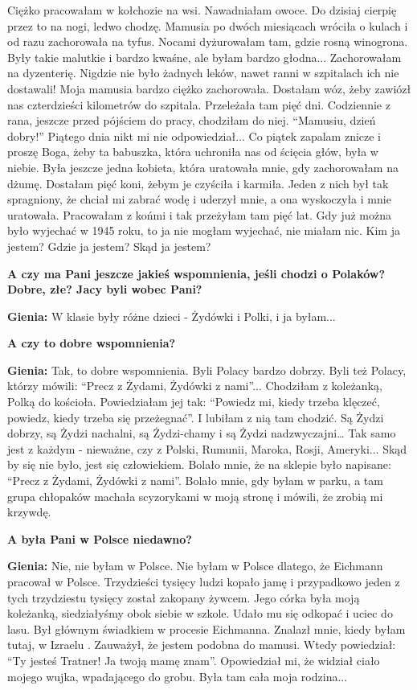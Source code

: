 Ciężko pracowałam w kołchozie na wsi. Nawadniałam owoce. Do dzisiaj cierpię przez to na nogi, ledwo chodzę. Mamusia po dwóch miesiącach wróciła o kulach i od razu zachorowała na tyfus. Nocami dyżurowałam tam, gdzie rosną winogrona. Były takie malutkie i bardzo kwaśne, ale byłam bardzo głodna... Zachorowałam na dyzenterię. Nigdzie nie było żadnych leków, nawet ranni w szpitalach ich nie dostawali! Moja mamusia bardzo ciężko zachorowała. Dostałam wóz, żeby zawiózł nas czterdzieści kilometrów do szpitala. Przeleżała tam pięć dni. Codziennie z rana, jeszcze przed pójściem do pracy, chodziłam do niej. "`Mamusiu, dzień dobry!"' Piątego dnia nikt mi nie odpowiedział...
Co piątek zapalam znicze i proszę Boga, żeby ta babuszka, która uchroniła nas od ścięcia głów, była w niebie. Była jeszcze jedna kobieta, która uratowała mnie, gdy zachorowałam na dżumę. Dostałam pięć koni, żebym je czyściła i karmiła. Jeden z nich był tak spragniony, że chciał mi zabrać wodę i uderzył mnie, a ona wyskoczyła i mnie uratowała. Pracowałam z końmi i tak przeżyłam tam pięć lat. Gdy już można było wyjechać w 1945 roku, to ja nie mogłam wyjechać, nie miałam nic. Kim ja jestem? Gdzie ja jestem? Skąd ja jestem?

\textbf{A czy ma Pani jeszcze jakieś wspomnienia, jeśli chodzi o Polaków? Dobre, złe? Jacy byli wobec Pani?}

\textbf{Gienia:} W klasie były różne dzieci - Żydówki i Polki, i ja byłam...

\textbf{A czy to dobre wspomnienia?}

\textbf{Gienia:} Tak, to dobre wspomnienia. Byli Polacy bardzo dobrzy. Byli też Polacy, którzy mówili: "`Precz z Żydami, Żydówki z nami"'... Chodziłam z koleżanką, Polką do kościoła. Powiedziałam jej tak: "`Powiedz mi, kiedy trzeba klęczeć, powiedz, kiedy trzeba się przeżegnać"'. I lubiłam z nią tam chodzić. Są Żydzi dobrzy, są Żydzi nachalni, są Żydzi-chamy i są Żydzi nadzwyczajni… Tak samo jest z każdym - nieważne, czy z Polski, Rumunii, Maroka, Rosji, Ameryki... Skąd by się nie było, jest się człowiekiem. Bolało mnie, że na sklepie było napisane: "`Precz z Żydami, Żydówki z nami"'. Bolało mnie, gdy byłam w parku, a tam grupa chłopaków machała scyzorykami w moją stronę i mówili, że zrobią mi krzywdę.

\textbf{A była Pani w Polsce niedawno?}

\textbf{Gienia:} Nie, nie byłam w Polsce. Nie byłam w Polsce dlatego, że Eichmann pracował w Polsce. Trzydzieści tysięcy ludzi kopało jamę i przypadkowo jeden z tych trzydziestu tysięcy został zakopany żywcem. Jego córka była moją koleżanką, siedziałyśmy obok siebie w szkole. Udało mu się odkopać i uciec do lasu. Był głównym świadkiem w procesie Eichmanna. Znalazł mnie, kiedy byłam tutaj, w Izraelu . Zauważył, że jestem podobna do mamusi. Wtedy powiedział: "`Ty jesteś Tratner! Ja twoją mamę znam"'. Opowiedział mi, że widział ciało mojego wujka, wpadającego do grobu. Była tam cała moja rodzina...